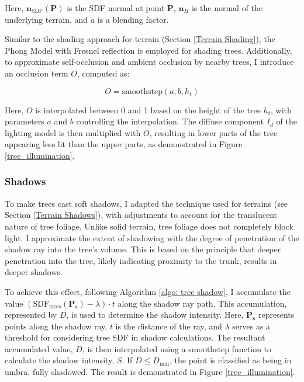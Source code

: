 Here, $\mathbf{n}_{\text{SDF}}(\mathbf{P})$ is the SDF normal at point $\mathbf{P}$, $\mathbf{n}_H$ is the normal of the underlying terrain, and $a$ is a blending factor.

Similar to the shading approach for terrain (Section \ref{Terrain Shading}), the Phong Model with Fresnel reflection is employed for shading trees. Additionally, to approximate self-occlusion and ambient occlusion by nearby trees, I introduce an occlusion term $O$, computed as:

\begin{equation}
O = \text{smoothstep}(a, b, h_t)
\end{equation}

Here, $O$ is interpolated between 0 and 1 based on the height of the tree $h_t$, with parameters $a$ and $b$ controlling the interpolation. The diffuse component $I_d$ of the lighting model is then multiplied with $O$, resulting in lower parts of the tree appearing less lit than the upper parts, as demonstrated in Figure \ref{tree_illumination}.

\subsubsection{Shadows}
\label{Tree Shadows}

To make trees cast soft shadows, I adapted the technique used for terrains (see Section \ref{Terrain Shadows}), with adjustments to account for the translucent nature of tree foliage. Unlike solid terrain, tree foliage does not completely block light. I approximate the extent of shadowing with the degree of penetration of the shadow ray into the tree's volume. This is based on the principle that deeper penetration into the tree, likely indicating proximity to the trunk, results in deeper shadows.

To achieve this effect, following Algorithm \ref{algo: tree shadow}, I accumulate the value $(\text{SDF}_{\text{trees}}(\mathbf{P_s}) - \lambda) \cdot t$ along the shadow ray path. This accumulation, represented by $D$, is used to determine the shadow intensity. Here, $\mathbf{P_s}$ represents points along the shadow ray, $t$ is the distance of the ray, and $\lambda$ serves as a threshold for considering tree SDF in shadow calculations. The resultant accumulated value, $D$, is then interpolated using a smoothstep function to calculate the shadow intensity, $S$. If $D \le D_{\text{min}}$, the point is classified as being in umbra, fully shadowed. The result is demonstrated in Figure \ref{tree_illumination}.

